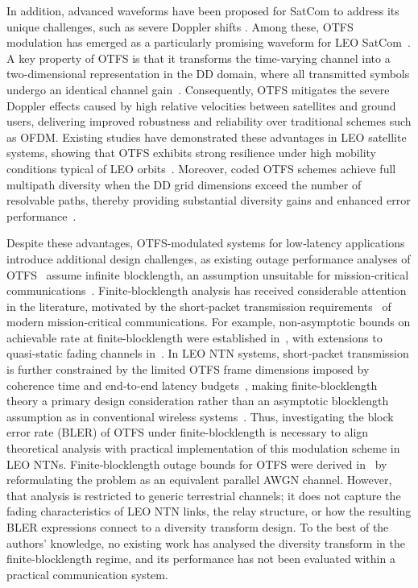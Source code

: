 \documentclass[lettersize,journal]{IEEEtran}
\begin{document}
In addition, advanced waveforms have been proposed for SatCom to address its 
unique challenges, such as severe Doppler shifts \cite{11373535}. Among these, OTFS modulation 
has emerged as a particularly promising waveform for LEO SatCom~\cite{Shi2022, 
Ren2025, 9508932,11373535}. A key property of OTFS is that it transforms the time-varying 
channel into a two-dimensional representation in the DD domain, 
where all transmitted symbols undergo an identical channel gain~\cite{9904495}. Consequently, OTFS mitigates the severe Doppler effects caused by high relative velocities between satellites and ground users, delivering improved robustness and reliability over traditional schemes such as OFDM. 
Existing studies have demonstrated these advantages in LEO satellite systems, showing that OTFS exhibits strong resilience under high mobility conditions typical of LEO orbits~\cite{Shi2022, Shi2024_Network}. Moreover, coded OTFS schemes achieve full multipath diversity when the DD grid dimensions exceed the number of resolvable paths, thereby providing substantial diversity gains and enhanced error performance~\cite{Li2021}.

Despite these advantages, OTFS-modulated systems for low‑latency applications introduce additional design challenges, as existing outage performance analyses of OTFS~\cite{Shi2022} assume infinite blocklength, an assumption unsuitable for mission‑critical communications~\cite{10529933}. Finite‑blocklength analysis has received considerable attention in the literature, motivated by the short‑packet transmission requirements~\cite{Durisi2016, Basnayaka2022,9528059} of modern mission‑critical communications. For example, non‑asymptotic bounds on achievable rate at finite-blocklength were established in~\cite{Polyanskiy2010}, with extensions to quasi‑static fading channels in~\cite{Yang2014, Durisi2016, Makki2014}. In LEO NTN systems, short‑packet transmission is further constrained by the limited OTFS frame dimensions imposed by coherence time and end‑to‑end latency budgets~\cite{10847811}, making finite‑blocklength theory a primary design consideration rather than an asymptotic blocklength assumption as in conventional wireless systems~\cite{Basnayaka2022,Makki2014}. Thus, investigating the block error rate (BLER) of OTFS under finite-blocklength is necessary to align theoretical analysis with practical implementation of this modulation scheme in LEO NTNs. Finite‑blocklength outage bounds for OTFS were derived in~\cite{Zhang2024} by reformulating the problem as an equivalent parallel AWGN channel. However, that analysis is restricted to generic terrestrial channels; it does not capture the fading characteristics of LEO NTN links, the relay structure, or how the resulting BLER expressions connect to a diversity transform design. To the best of the authors’ knowledge, no existing work has analysed the diversity transform in the finite‑blocklength regime, and its performance has not been evaluated within a practical communication system.
\end{document}
